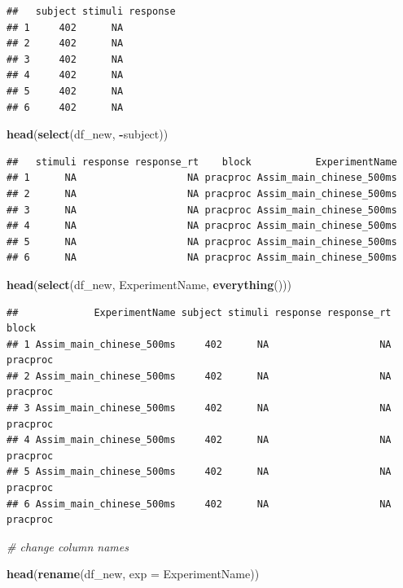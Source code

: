 \documentclass[]{book}
\newenvironment{Shaded}{\begin{snugshade}}{\end{snugshade}}
\newcommand{\KeywordTok}[1]{\textcolor[rgb]{0.13,0.29,0.53}{\textbf{#1}}}
\newcommand{\DataTypeTok}[1]{\textcolor[rgb]{0.13,0.29,0.53}{#1}}
\newcommand{\CommentTok}[1]{\textcolor[rgb]{0.56,0.35,0.01}{\textit{#1}}}
\newcommand{\OperatorTok}[1]{\textcolor[rgb]{0.81,0.36,0.00}{\textbf{#1}}}
\newcommand{\NormalTok}[1]{#1}
\begin{document}
\begin{verbatim}
##   subject stimuli response
## 1     402      NA         
## 2     402      NA         
## 3     402      NA         
## 4     402      NA         
## 5     402      NA         
## 6     402      NA
\end{verbatim}

\begin{Shaded}
\begin{Highlighting}[]
\KeywordTok{head}\NormalTok{(}\KeywordTok{select}\NormalTok{(df_new, }\OperatorTok{-}\NormalTok{subject))}
\end{Highlighting}
\end{Shaded}

\begin{verbatim}
##   stimuli response response_rt    block           ExperimentName
## 1      NA                   NA pracproc Assim_main_chinese_500ms
## 2      NA                   NA pracproc Assim_main_chinese_500ms
## 3      NA                   NA pracproc Assim_main_chinese_500ms
## 4      NA                   NA pracproc Assim_main_chinese_500ms
## 5      NA                   NA pracproc Assim_main_chinese_500ms
## 6      NA                   NA pracproc Assim_main_chinese_500ms
\end{verbatim}

\begin{Shaded}
\begin{Highlighting}[]
\KeywordTok{head}\NormalTok{(}\KeywordTok{select}\NormalTok{(df_new, ExperimentName, }\KeywordTok{everything}\NormalTok{()))}
\end{Highlighting}
\end{Shaded}

\begin{verbatim}
##             ExperimentName subject stimuli response response_rt    block
## 1 Assim_main_chinese_500ms     402      NA                   NA pracproc
## 2 Assim_main_chinese_500ms     402      NA                   NA pracproc
## 3 Assim_main_chinese_500ms     402      NA                   NA pracproc
## 4 Assim_main_chinese_500ms     402      NA                   NA pracproc
## 5 Assim_main_chinese_500ms     402      NA                   NA pracproc
## 6 Assim_main_chinese_500ms     402      NA                   NA pracproc
\end{verbatim}

\begin{Shaded}
\begin{Highlighting}[]
\CommentTok{# change column names}

\KeywordTok{head}\NormalTok{(}\KeywordTok{rename}\NormalTok{(df_new, }\DataTypeTok{exp =}\NormalTok{ ExperimentName))}
\end{Highlighting}
\end{Shaded}
\end{document}
